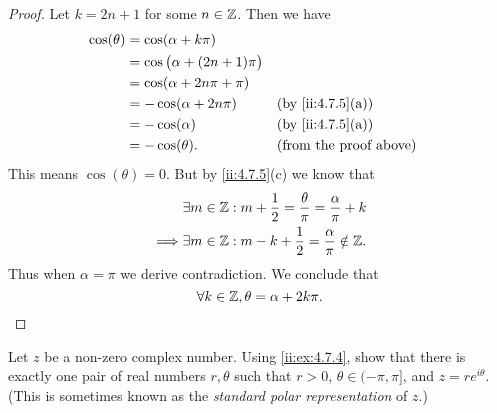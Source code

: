 \begin{proof}
  Let \(k = 2n + 1\) for some \(n \in \mathbb{Z}\).
  Then we have
  \begin{align*}
    \cos(\theta) & = \cos(\alpha + k \pi)                                                   \\
                 & = \cos\big(\alpha + (2n + 1) \pi\big)                                    \\
                 & = \cos(\alpha + 2 n \pi + \pi)                                           \\
                 & = -\cos(\alpha + 2 n \pi)             &  & \by{ii:4.7.5}[a]              \\
                 & = -\cos(\alpha)                       &  & \by{ii:4.7.5}[a]              \\
                 & = -\cos(\theta).                      &  & \text{(from the proof above)}
  \end{align*}
  This means \(\cos(\theta) = 0\).
  But by \cref{ii:4.7.5}(c) we know that
  \begin{align*}
             & \exists m \in \mathbb{Z} : m + \dfrac{1}{2} = \dfrac{\theta}{\pi} = \dfrac{\alpha}{\pi} + k \\
    \implies & \exists m \in \mathbb{Z} : m - k + \dfrac{1}{2} = \dfrac{\alpha}{\pi} \notin \mathbb{Z}.
  \end{align*}
  Thus when \(\alpha = \pi\) we derive contradiction.
  We conclude that
  \[
    \forall k \in \mathbb{Z}, \theta = \alpha + 2 k \pi.
  \]
\end{proof}

\begin{ex}\label{ii:ex:4.7.6}
  Let \(z\) be a non-zero complex number.
  Using \cref{ii:ex:4.7.4}, show that there is exactly one pair of real numbers \(r, \theta\) such that \(r > 0\), \(\theta \in (-\pi, \pi]\), and \(z = r e^{i \theta}\).
  (This is sometimes known as the \emph{standard polar representation} of \(z\).)
\end{ex}

